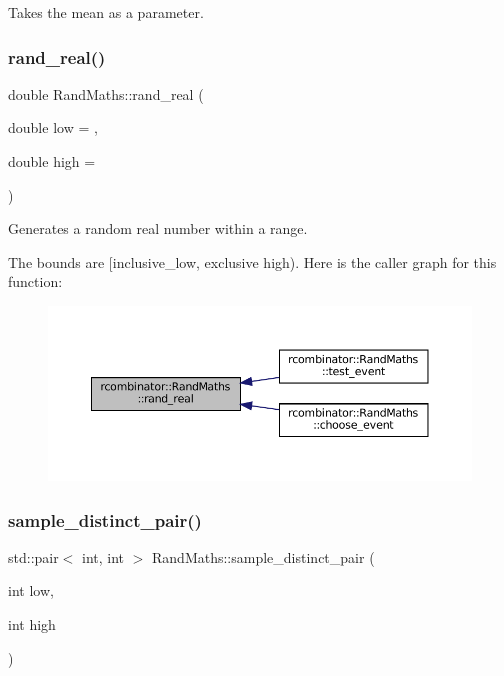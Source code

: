 Takes the mean as a parameter. \mbox{\label{classrcombinator_1_1RandMaths_aa6441baa59bff50f588c0c54e3c54140}} 
\subsubsection{\texorpdfstring{rand\+\_\+real()}{rand\_real()}}
{\footnotesize\ttfamily double Rand\+Maths\+::rand\+\_\+real (\begin{DoxyParamCaption}\item[{double}]{low = {},  }\item[{double}]{high = {} }\end{DoxyParamCaption})}



Generates a random real number within a range. 

The bounds are \mbox{[}inclusive\+\_\+low, exclusive high). Here is the caller graph for this function\+:
\nopagebreak
\begin{figure}[H]
\begin{center}
\leavevmode
\includegraphics[width=350pt]{classrcombinator_1_1RandMaths_aa6441baa59bff50f588c0c54e3c54140_icgraph}
\end{center}
\end{figure}
\mbox{\label{classrcombinator_1_1RandMaths_aaa759efa3059b6793100cb6b6442f26d}} 
\subsubsection{\texorpdfstring{sample\+\_\+distinct\+\_\+pair()}{sample\_distinct\_pair()}}
{\footnotesize\ttfamily std\+::pair$<$ int, int $>$ Rand\+Maths\+::sample\+\_\+distinct\+\_\+pair (\begin{DoxyParamCaption}\item[{int}]{low,  }\item[{int}]{high }\end{DoxyParamCaption})}



